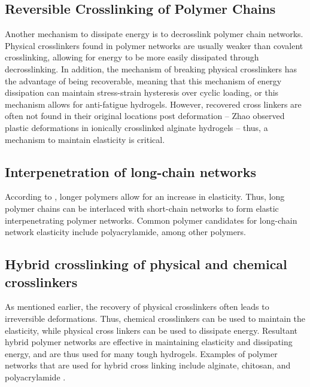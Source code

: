 \subsection{Reversible Crosslinking of Polymer Chains}
Another mechanism to dissipate energy is to decrosslink polymer chain networks. Physical crosslinkers found in polymer networks are usually weaker than covalent crosslinking, allowing for energy to be more easily dissipated through decrosslinking. In addition, the mechanism of breaking physical crosslinkers has the advantage of being recoverable, meaning that this mechanism of energy dissipation can maintain stress-strain hysteresis over cyclic loading, or this mechanism allows for anti-fatigue hydrogels. However, recovered cross linkers are often not found in their original locations post deformation – Zhao observed plastic deformations in ionically crosslinked alginate hydrogels – thus, a mechanism to maintain elasticity is critical.

\subsection{Interpenetration of long-chain networks}
According to \cite{rubinstein_networks_2003}, longer polymers allow for an increase in elasticity. Thus, long polymer chains can be interlaced with short-chain networks to form elastic interpenetrating polymer networks. Common polymer candidates for long-chain network elasticity include polyacrylamide, among other polymers.

\subsection{Hybrid crosslinking of physical and chemical crosslinkers}
As mentioned earlier, the recovery of physical crosslinkers often leads to irreversible deformations. Thus, chemical crosslinkers can be used to maintain the elasticity, while physical cross linkers can be used to dissipate energy. Resultant hybrid polymer networks are effective in maintaining elasticity and dissipating energy, and are thus used for many tough hydrogels. Examples of polymer networks that are used for hybrid cross linking include alginate, chitosan, and polyacrylamide \autocite{zhao_multi-scale_2014}.

